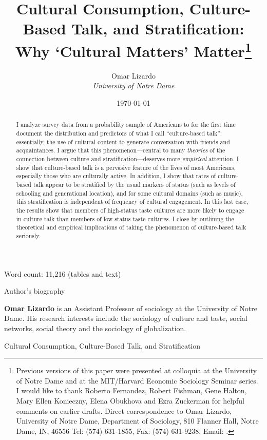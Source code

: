 \documentclass[11pt]{article}
\begin{document}
\title{Cultural Consumption, Culture-Based Talk, and Stratification:  Why `Cultural Matters' Matter\footnote{Previous versions of this paper were presented at colloquia at the University of Notre Dame and at the MIT/Harvard Economic Sociology Seminar series. I would like to thank Roberto Fernandez, Robert Fishman, Gene Halton, Mary Ellen Konieczny, Elena Obukhova and Ezra Zuckerman for helpful comments on earlier drafts.  Direct correspondence to Omar Lizardo, University of Notre Dame, Department of Sociology, 810 Flanner Hall, Notre Dame, IN, 46556  Tel: (574) 631-1855, Fax: (574) 631-9238, Email: .}}

\author{Omar Lizardo \\ \textit{University of Notre Dame}}


\date{\today}


\maketitle

\begin{center}
	Word count:  11,216 (tables and text)
\end{center}

\newpage
\begin{center}
	{\large Author's biography}
\end{center}
{\bf Omar Lizardo} is an Assistant Professor of sociology at the University of Notre Dame.  His research interests include the sociology of culture and taste, social networks, social theory and the sociology of globalization.

\newpage
\begin{center}
	{\large Cultural Consumption, Culture-Based Talk, and Stratification}
\end{center}
\begin{abstract}
\small I analyze survey data from a probability sample of Americans to  for the first time document the distribution and predictors of what I call ``culture-based talk'': essentially, the use of cultural content to generate conversation with friends and acquaintances.  I argue that this phenomenon---central to many \emph{theories} of the connection between culture and stratification---deserves more \emph{empirical} attention. I show that culture-based talk is a pervasive feature of the lives of most Americans, especially those who are culturally active. In addition, I show that rates of culture-based talk appear to be stratified by the usual markers of status (such as levels of schooling and generational location), and for some cultural domains (such as music), this stratification is independent of frequency of cultural engagement.  In this last case, the results show that members of high-status taste cultures are more likely to engage in culture-talk than members of low status taste cultures.  I close by outlining the theoretical and empirical implications of taking the phenomenon of culture-based talk seriously. 
\end{abstract}
\end{document}
